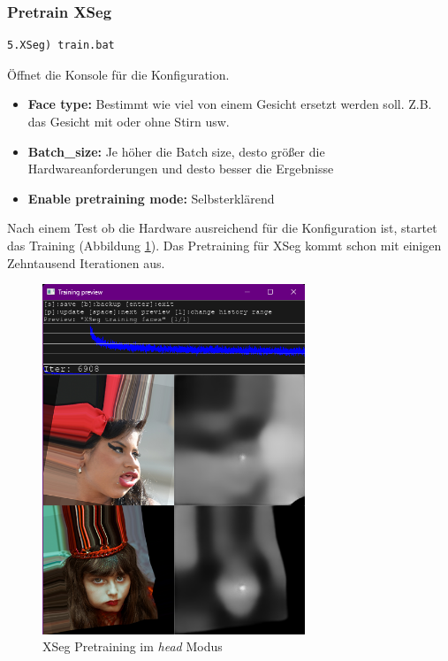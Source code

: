 \subsubsection{Pretrain XSeg}
\begin{lstlisting}[label={lst:xseg-pretraining},numbers=none]
    5.XSeg) train.bat
\end{lstlisting}
Öffnet die Konsole für die Konfiguration.
\begin{itemize}
    \item \textbf{Face type:} Bestimmt wie viel von einem Gesicht ersetzt werden soll. Z.B. das Gesicht mit oder ohne Stirn usw.
    \item \textbf{Batch\_size:} Je höher die Batch size, desto größer die Hardwareanforderungen und desto besser die Ergebnisse
    \item \textbf{Enable pretraining mode:} Selbsterklärend
\end{itemize}
Nach einem Test ob die Hardware ausreichend für die Konfiguration ist, startet das Training (Abbildung \ref{fig:xseg-pretrain}).
Das Pretraining für XSeg kommt schon mit einigen Zehntausend Iterationen aus.
\begin{figure}
    \center
    \includegraphics[width=0.7\textwidth]{Bilder/DFL/XSegEditor-3-pretrain}
    \caption{XSeg Pretraining im \textit{head} Modus}
    \label{fig:xseg-pretrain}
\end{figure}

